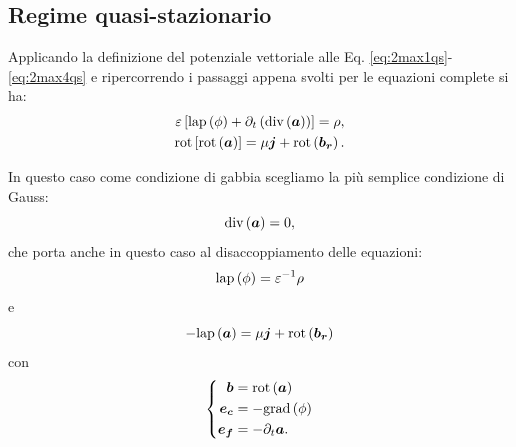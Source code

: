 \subsection{Regime quasi-stazionario}
Applicando la definizione del potenziale vettoriale alle Eq. \eqref{eq:2max1qs}-\eqref{eq:2max4qs} e ripercorrendo i passaggi appena svolti per le equazioni complete si ha:
\begin{align}
\label{eq:2pot1qs}
\varepsilon\left[ \text{lap}\left(\phi\right)+\partial_t\left( \text{div}\left(\boldsymbol{a}\right)\right)\right] = \rho,\\
\text{rot} \left[\text{rot}\left(\boldsymbol{a}\right) \right] = \mu\boldsymbol{j}+\text{rot}\left(\boldsymbol{b_r}\right).
\end{align}

In questo caso come condizione di gabbia scegliamo la più semplice condizione di Gauss:
\begin{equation}
\label{eq:2gaussgauge}
\text{div}\left(\boldsymbol{a}\right) = 0,
\end{equation}
che porta anche in questo caso al disaccoppiamento delle equazioni:
\begin{equation}
\label{eq:2pot2qs}
\text{lap}\left({\phi}\right) = \varepsilon^{-1} \rho
\end{equation}
e
\begin{equation}
\label{eq:2pot3qs}
-\text{lap}\left(\boldsymbol{a}\right) = \mu\boldsymbol{j}+\text{rot}\left(\boldsymbol{b_r}\right)
\end{equation}
con
\begin{equation}
\label{eq:2pot4qs}
\left\{
\begin{aligned}
\boldsymbol{b}&=\text{rot} \left(\boldsymbol{a}\right)\\
\boldsymbol{e_c} &= -\text{grad}\left(\phi\right)\\
\boldsymbol{e_f} &= -\partial_t \boldsymbol{a}.
\end{aligned}
\right.
\end{equation}

